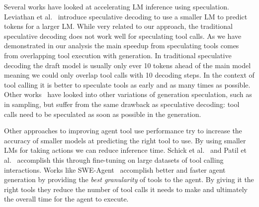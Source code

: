 Several works have looked at accelerating LM inference using speculation.
Leviathan et al.~\cite{leviathan_fast_2023} introduce speculative decoding to use a smaller LM to predict tokens for a larger LM.
While very related to our approach, the traditional speculative decoding does not work well for speculating tool calls.
As we have demonstrated in our analysis the main speedup from speculating tools comes from overlapping tool execution with generation.
In traditional speculative decoding the draft model is usually only ever 10 tokens ahead of the main model meaning we could only overlap tool calls with 10 decoding steps.
In the context of tool calling it is better to speculate tools as early and as many times as possible.
Other works~\cite{chen2023accelerating} have looked into other variations of generation speculation, such as in sampling, but suffer from the same drawback as speculative decoding: tool calls need to be speculated as soon as possible in the generation.

Other approaches to improving agent tool use performance try to increase the accuracy of smaller models at predicting the right tool to use. By using smaller LMs for taking actions we can reduce inference time. Schick et al.~\cite{schick2023toolformer} and Patil et al.~\cite{patil_gorilla_2023} accomplish this through fine-tuning on large datasets of tool calling interactions.
Works like SWE-Agent~\cite{yang2024swe} accomplish better and faster agent generation by providing the {\it best granularity} of tools to the agent. By giving it the right tools they reduce the number of tool calls it needs to make and ultimately the overall time for the agent to execute.
